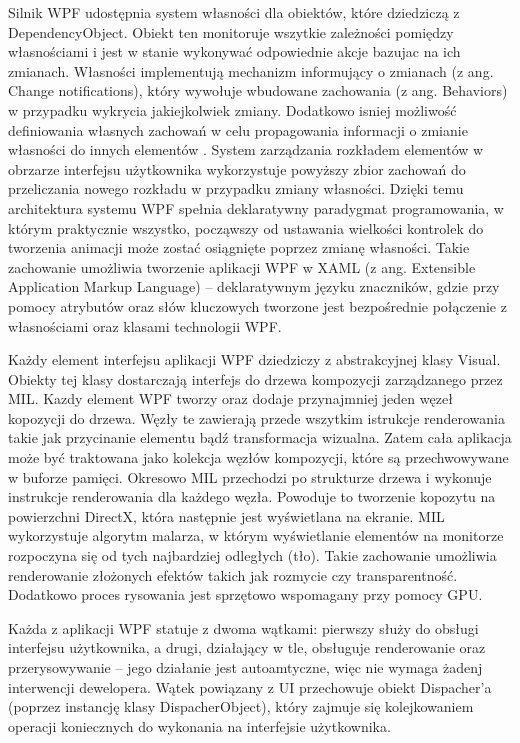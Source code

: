 Silnik WPF udostępnia system własności dla obiektów, które dziedziczą z DependencyObject. Obiekt ten monitoruje  wszytkie zależności pomiędzy własnościami i jest w stanie wykonywać odpowiednie akcje bazujac na ich zmianach. Własności implementują mechanizm informujący o zmianach (z ang. Change notifications), który wywołuje wbudowane zachowania (z ang. Behaviors) w przypadku wykrycia jakiejkolwiek zmiany. Dodatkowo isniej możliwość definiowania własnych zachowań w celu propagowania informacji o zmianie własności do innych elementów . System zarządzania rozkładem elementów w obrzarze interfejsu użytkownika wykorzystuje powyższy zbior zachowań do przeliczania nowego rozkładu w przypadku zmiany własności. Dzięki temu architektura systemu WPF spełnia deklaratywny paradygmat programowania, w którym praktycznie wszystko, począwszy od ustawania wielkości kontrolek do tworzenia animacji może zostać osiągnięte poprzez zmianę własności. Takie zachowanie umożliwia tworzenie aplikacji WPF w XAML (z ang. Extensible Application Markup Language) – deklaratywnym języku znaczników, gdzie przy pomocy atrybutów oraz słów kluczowych tworzone jest bezpośrednie połączenie z własnościami oraz klasami technologii WPF. 

Każdy element interfejsu aplikacji WPF dziedziczy z abstrakcyjnej klasy Visual. Obiekty tej klasy dostarczają interfejs do drzewa kompozycji zarządzanego przez MIL. Kazdy element WPF tworzy oraz dodaje przynajmniej jeden węzeł kopozycji do drzewa. Węzły te zawierają przede wszytkim istrukcje renderowania takie jak przycinanie elementu bądź transformacja wizualna. Zatem cała aplikacja może być traktowana jako kolekcja węzłów kompozycji, które są przechwowywane w buforze pamięci. Okresowo MIL przechodzi po strukturze drzewa i wykonuje instrukcje renderowania dla każdego węzła. Powoduje to tworzenie kopozytu na powierzchni DirectX, która następnie jest wyświetlana na ekranie.  MIL wykorzystuje algorytm malarza, w którym wyświetlanie elementów na monitorze rozpoczyna się od tych najbardziej odległych (tło). Takie zachowanie umożliwia renderowanie złożonych efektów takich jak rozmycie czy transparentność. Dodatkowo proces rysowania jest sprzętowo wspomagany przy pomocy GPU. 

Każda z aplikacji WPF statuje z dwoma wątkami: pierwszy służy do obsługi interfejsu użytkownika, a drugi, działający w tle, obsługuje renderowanie oraz przerysowywanie – jego działanie jest autoamtyczne, więc nie wymaga żadenj interwencji dewelopera. Wątek powiązany z UI przechowuje obiekt Dispacher’a (poprzez instancję klasy DispacherObject), który zajmuje się kolejkowaniem operacji koniecznych do wykonania na interfejsie użytkownika.


